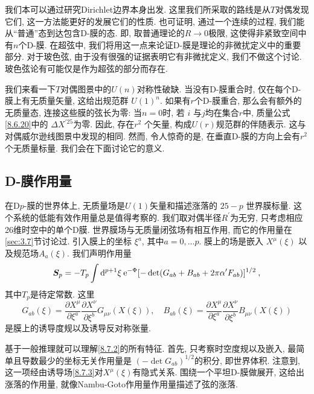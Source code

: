 我们本可以通过研究Dirichlet边界本身出发. 这里我们所采取的路线是从$T$对偶发现它们, 这一方法能更好的发展它们的性质. 
也可证明, 通过一个连续的过程, 我们能从``普通''态到达包含D-膜的态. 即, 取普通理论的$R \rightarrow 0$极限, 这使得非紧致空间中有$n$个D-膜. 
在超弦中, 我们将用这一点来论证D-膜是理论的非微扰定义中的重要部分. 对于玻色弦, 由于没有很强的证据表明它有非微扰定义, 我们不做这个讨论. 
玻色弦论有可能仅是作为超弦的部分而存在.

我们来看一下$T$对偶图景中的$U(n)$对称性破缺. 当没有D-膜重合时, 仅在每个D-膜上有无质量矢量, 这给出规范群 $U(1)^{n}$. 
如果有$r$个D-膜重合, 那么会有额外的无质量态, 连接这些膜的弦长为零: 当$n=0$时, 若 $i$ 与$j$均在集合$r$中, 
质量公式\eqref{8.6.20}中的 $\Delta X^{\prime 25}$为零. 因此, 存在$r^{2}$ 个矢量, 构成$U(r)$规范群的伴随表示. 
这与对偶威尔逊线图景中发现的相同. 然而, 令人惊奇的是, 在垂直D-膜的方向上会有$r^{2}$个无质量标量. 我们会在下面讨论它的意义.

\subsection*{D-膜作用量}
在D$p$-膜的世界体上, 无质量场是$U(1)$矢量和描述涨落的 $25{-}p$ 世界膜标量. 这个系统的低能有效作用量总是值得考察的. 
我们取对偶半径$R^{\prime}$为无穷, 只考虑相应26维时空中的单个D膜. 世界膜场与无质量闭弦场有相互作用, 而它的作用量在\ref{sec:3.7}节讨论过. 
引入膜上的坐标 $\xi^{a}$, 其中$a=0, \ldots p$. 膜上的场是嵌入 $X^{\mu}(\xi)$ 以及规范场$A_{a}(\xi)$. 我们声明作用量
\begin{equation}
	\bm{S}_{p} = -T_{p} \int \mathrm{d}^{p+1} \xi \: 
				\mathrm{e}^{-\Phi}[-\operatorname{det}(G_{ab} + B_{ab} + 2 \pi \alpha^{\prime} F_{a b})]^{1/2} \:, \label{8.7.2}
\end{equation}
其中$T_{p}$是待定常数. 这里
\begin{equation}
	G_{ab}(\xi) = \frac{\partial X^{\mu}}{\partial \xi^{a}} \frac{\partial X^{\nu}}{\partial \xi^{b}} G_{\mu \nu}(X(\xi)), \quad 
	B_{ab}(\xi) = \frac{\partial X^{\mu}}{\partial \xi^{a}} \frac{\partial X^{\nu}}{\partial \xi^{b}} B_{\mu \nu}(X(\xi)) \label{8.7.3}
\end{equation}
是膜上的诱导度规以及诱导反对称张量.

基于一般推理就可以理解\eqref{8.7.2}的所有特征. 首先, 只考察时空度规以及嵌入, 
最简单且导数最少的坐标无关作用量是 $(-\operatorname{det} G_{a b})^{1/2}$的积分, 即世界体积. 
注意到, 这一项经由诱导场\eqref{8.7.3}对$X^{\mu}(\xi)$有隐式关系. 围绕一个平坦D-膜做展开, 这给出涨落的作用量, 
就像Nambu-Goto作用量作用量描述了弦的涨落.

